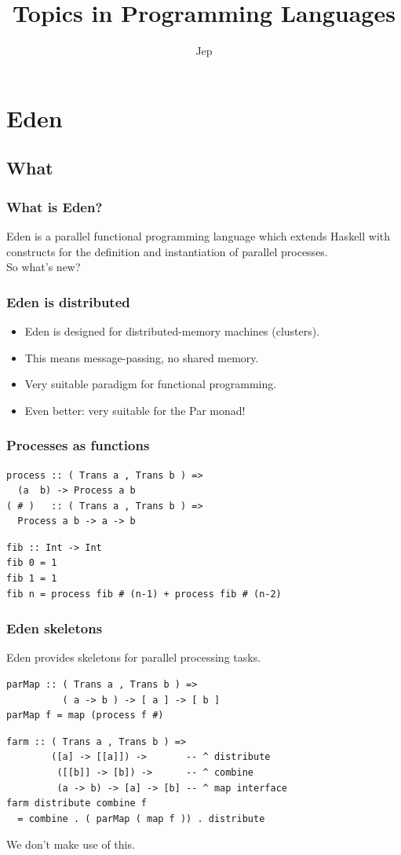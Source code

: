 \documentclass[12pt, danish]{beamer}
\title{Topics in Programming Languages}
\author{Jep}
\begin{document}
\begin{frame}
\titlepage
\end{frame}

\section{Eden}

\subsection{What}

\begin{frame}
\frametitle{What is Eden?}

Eden is a parallel functional programming language which extends
Haskell with constructs for the definition and instantiation of
parallel processes.\\
\pause
So what's new?
\end{frame}

\begin{frame}
\frametitle{Eden is distributed}

\begin{itemize}
\item Eden is designed for distributed-memory machines (clusters).\pause
\item This means message-passing, no shared memory.\pause
\item Very suitable paradigm for functional programming.\pause
\item Even better: very suitable for the Par monad!
\end{itemize}
\end{frame}

\begin{frame}[fragile]
\frametitle{Processes as functions}

\begin{verbatim}
process :: ( Trans a , Trans b ) =>
  (a  b) -> Process a b
( # )   :: ( Trans a , Trans b ) =>
  Process a b -> a -> b
\end{verbatim}
\pause
\begin{verbatim}
fib :: Int -> Int
fib 0 = 1
fib 1 = 1
fib n = process fib # (n-1) + process fib # (n-2)
\end{verbatim}
\end{frame}

\begin{frame}[fragile]
\frametitle{Eden skeletons}

Eden provides skeletons for parallel processing tasks.

\begin{verbatim}
parMap :: ( Trans a , Trans b ) =>
          ( a -> b ) -> [ a ] -> [ b ]
parMap f = map (process f #)
\end{verbatim}
\pause
\begin{verbatim}
farm :: ( Trans a , Trans b ) =>
        ([a] -> [[a]]) ->       -- ^ distribute
         ([[b]] -> [b]) ->      -- ^ combine
         (a -> b) -> [a] -> [b] -- ^ map interface
farm distribute combine f
  = combine . ( parMap ( map f )) . distribute
\end{verbatim}
\pause
We don't make use of this.
\end{frame}
\end{document}
